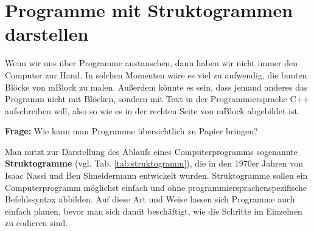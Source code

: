 \newpage
\section{Programme mit Struktogrammen darstellen}
Wenn wir uns über Programme austauschen, dann haben wir nicht immer den Computer zur Hand. In solchen Momenten wäre es viel zu aufwendig, die bunten Blöcke von mBlock zu malen. Außerdem könnte es sein, dass jemand anderes das Programm nicht mit Blöcken, sondern mit Text in der Programmiersprache C++ aufschreiben will, also so wie es in der rechten Seite von mBlock abgebildet ist.

\begin{ziel}
	\textbf{Frage:} Wie kann man Programme übersichtlich zu Papier bringen?
\end{ziel}

Man nutzt zur Darstellung des Ablaufs eines Computerprogramms sogenannte \textbf{Struktogramme} (vgl. Tab. \ref{tab:struktogramm}), die in den 1970er Jahren von Isaac Nassi und Ben Shneidermann entwickelt wurden. Struktogramme sollen ein Computerprogramm möglichst einfach und ohne programmiersprachenspezifische Befehlssyntax abbilden. Auf diese Art und Weise lassen sich Programme auch einfach planen, bevor man sich damit beschäftigt, wie die Schritte im Einzelnen zu codieren sind.

